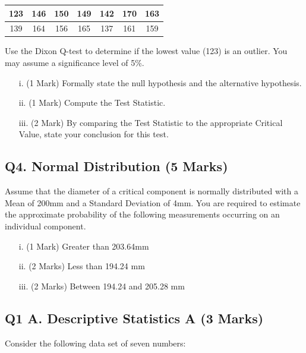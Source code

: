 \documentclass[a4paper,12pt]{article}
\begin{document}
\begin{center}
	\begin{tabular}{|c|c|c|c|c|c|c|}
		\hline
		123 & 146 & 150 &149 &142 &170& 163\\ \hline
		139 & 164 & 156& 165& 137& 161& 159
		\\ \hline
	\end{tabular}
\end{center}
Use the Dixon Q-test to determine if the lowest value (123) is an outlier. You may assume a significance level of 5\%.

\begin{itemize}
	\item[i.] (1 Mark) Formally state the null hypothesis and the alternative hypothesis.
	\item[ii.] (1 Mark) Compute the Test Statistic.
	\item[iii.] (2 Mark) By comparing the Test Statistic to the appropriate Critical Value, state your conclusion for this test.
\end{itemize}
\newpage
\subsection*{Q4. Normal Distribution (5 Marks)} %
Assume that the diameter of a critical component is normally distributed with a Mean of 200mm and a Standard Deviation of 4mm. You are required  to estimate the approximate probability of the following measurements occurring on an individual component.
\begin{itemize}
	\item [i.](1 Mark) Greater than 203.64mm
	\item [ii.](2 Marks) Less than 194.24 mm
	\item [iii.](2 Marks) Between 194.24 and 205.28 mm
\end{itemize}
\bigskip

\newpage

\subsection*{Q1 A. Descriptive Statistics A (3 Marks)} %
Consider the following data set of seven numbers:
\end{document}
